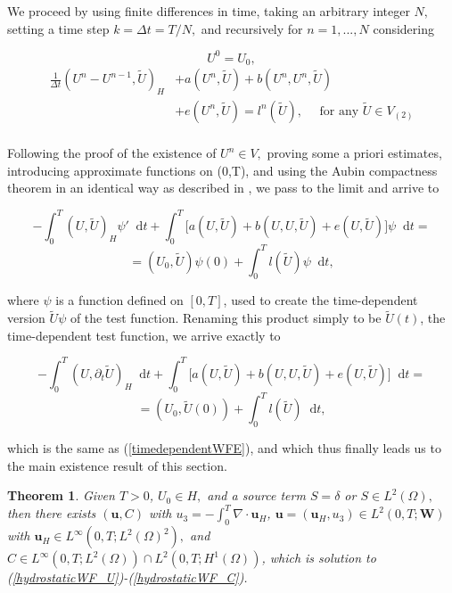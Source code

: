 \documentclass[11pt]{article}
\newtheorem{theorem}{Theorem}
\newcommand*\diff{\mathop{}\!\mathrm{d}}
\begin{document}
We proceed by using finite differences in time, taking an arbitrary integer $N,$ setting a time step $k = \Delta t = T/N,$ and recursively for $n = 1, ... , N$ considering

\[ U^0 = U_0,\]
\begin{equation}
  \begin{split}
    \frac{1}{\Delta t} (U^n - U^{n-1}, \tilde{U})_H & +  a(U^n, \tilde{U}) + b(U^n,U^n, \tilde{U})\\
    & + e(U^n, \tilde{U}) = l^n(\tilde{U}), \quad \text{ for any } \tilde{U} \in V_{(2)} \\
  \end{split}
\end{equation}

Following the proof of the existence of $U^n \in V,$ proving some a priori estimates, introducing approximate functions on (0,T), and using the Aubin compactness theorem in an identical way as described in \cite{temam2005some}, we pass to the limit and arrive to

\[ - \int_0^T (U, \tilde{U})_H \psi ' \diff t + \int_0^T \big [ a(U, \tilde{U}) + b(U,U, \tilde{U}) + e(U, \tilde{U}) \big ] \psi \diff t = \]
\[ = (U_0, \tilde{U}) \psi (0) + \int_0 ^ T l(\tilde{U}) \psi \diff t, \]

where $\psi$ is a function defined on $[0,T]$, used to create the time-dependent version $\tilde{U}\psi$ of the test function. Renaming this product simply to be $\tilde{U}(t)$, the time-dependent test function, we arrive exactly to

\[ - \int_0^T (U, \partial_t \tilde{U})_H \diff t + \int_0^T \big [ a(U, \tilde{U}) + b(U,U, \tilde{U}) + e(U, \tilde{U}) \big ] \diff t = \]
\[ = (U_0, \tilde{U}(0)) + \int_0 ^ T l(\tilde{U}) \diff t, \]

which is the same as (\ref{timedependentWFE}), and which thus finally leads us to the main existence result of this section.

\begin{theorem}

Given $T > 0$, $U_0 \in H,$ and a source term $S = \delta$ or $S \in L^2(\Omega),$ then there exists $(\mathbf{u}, C)$ with $u_3 = - \int_0^T \nabla \cdot \mathbf{u}_H$, $\mathbf{u} = (\mathbf{u}_H, u_3) \in L^2 (0, T; \mathbf{W})$ with $\mathbf{u}_H \in L^\infty (0,T; L^2(\Omega)^2),$ and $C \in L^\infty (0,T; L^2 (\Omega)) \cap L^2( 0,T; H^1(\Omega))$, which is solution to (\ref{hydrostaticWF_U})-(\ref{hydrostaticWF_C}).

\end{theorem}

\nocite{*}


\end{document}
